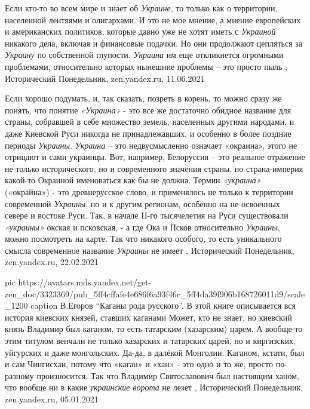 Если кто-то во всем мире и знает об \emph{Украине}, то только как о территории,
населенной лентяями и олигархами. И это не мое мнение, а мнение европейских и
американских политиков, которые давно уже не хотят иметь с \emph{Украиной} никакого
дела, включая и финансовые подачки. Но они продолжают цепляться за \emph{Украину} по
собственной глупости. \emph{Украина} им еще откликнется огромными проблемами,
относительно которых нынешние проблемы – это просто пыль
, 
Исторический Понедельник, zen.yandex.ru, 11.06.2021

Если хорошо подумать, и, так сказать, позреть в корень, то можно сразу же
понять, что понятие \emph{«Украина»} - это все же достаточно обидное название для
страны, собравшей в себе множество земель, населенных другими народами, и даже
Киевской Руси никогда не принадлежавших, и особенно в более поздние периоды
\emph{Украины}. \emph{Украина} – это недвусмысленно означает «окраина», этого не отрицают и
сами украинцы. Вот, например, Белоруссия – это реальное отражение не только
исторического, но и современного значения страны, но страна-империя какой-то
Окраиной именоваться как бы не должна.  Термин \emph{«украина»} («окрайна») - это
древнерусское слово, и применялось не только к территории современной \emph{Украины},
но и к другим регионам, особенно на не освоенных севере и востоке Руси. Так, в
начале II-го тысячелетия на Руси существовали \emph{«украины»} окская и псковская, - а
где Ока и Псков относительно \emph{Украины}, можно посмотреть на карте. Так что
никакого особого, то есть уникального смысла современное название \emph{Украины} не
имеет
, Исторический Понедельник, zen.yandex.ru, 22.02.2021

\ifcmt
  pic https://avatars.mds.yandex.net/get-zen_doc/3323369/pub_5ff4cffafe4e686f6a93f46c_5ff4da39f906b168726011d9/scale_1200
  caption В.Егоров \enquote{Каганы рода русского}. В этой книге описывается вся история киевских князей, ставших каганами
\fi
Может, кто не знает, но киевский князь Владимир был каганом, то есть татарским
(хазарским) царем. А вообще-то этим титулом венчали не только хазарских и
татарских царей, но и киргизских, уйгурских и даже монгольских. Да-да, в
далёкой Монголии. Каганом, кстати, был и сам Чингисхан, потому что «каган» и
«хан» - это одно и то же, просто по-разному произносится. Так что Владимир
Святославович был настоящим ханом, что вообще ни в какие \emph{украинские ворота} не
лезет
,
Исторический Понедельник, zen.yandex.ru, 05.01.2021 


